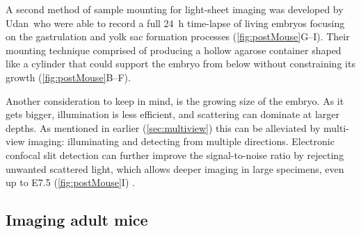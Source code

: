     A second method of sample mounting for light-sheet imaging was developed by Udan~\etal who were able to record a full \SI{24}{h} time-lapse of living embryos focusing on the gastrulation and yolk sac formation processes (\autoref{fig:postMouse}G--I). Their mounting technique comprised of producing a hollow agarose container shaped like a cylinder that could support the embryo from below without constraining its growth (\autoref{fig:postMouse}B--F).

    Another consideration to keep in mind, is the growing size of the embryo. As it gets bigger, illumination is less efficient, and scattering can dominate at larger depths. As mentioned in earlier (\autoref{sec:multiview}) this can be alleviated by multi-view imaging: illuminating and detecting from multiple directions. Electronic confocal slit detection can further improve the signal-to-noise ratio by rejecting unwanted scattered light, which allows deeper imaging in large specimens, even up to E7.5 (\autoref{fig:postMouse}I) \cite{de_medeiros_confocal_2015}.

  \subsection{Imaging adult mice}
    
